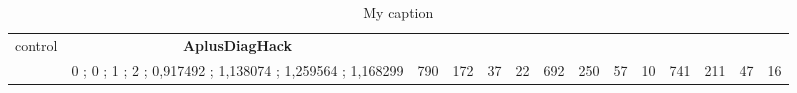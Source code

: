 \begin{table}[]
{\begin{tabular}{|c|c|c|c|c|c|c|c|c|c|c|c|c|c|}
control & \cellcolor{blue!15}\textbf{AplusDiagHack}& {\color[HTML]{00009B} } & {\color[HTML]{9A0000} } & {\color[HTML]{009901} } &  & {\color[HTML]{00009B} } & {\color[HTML]{9A0000} } & {\color[HTML]{009901} } &  & {\color[HTML]{00009B} } & {\color[HTML]{9A0000} } & {\color[HTML]{009901} } &  \\ 
 & \cellcolor{ blue!15}0 ; 0 ; 1 ; 2 ; 0,917492 ; 1,138074 ; 1,259564 ; 1,168299 & \multirow{-2}{*}{{\color[HTML]{00009B} 790}} & \multirow{-2}{*}{{\color[HTML]{9A0000} 172}} & \multirow{-2}{*}{{\color[HTML]{009901} 37}} & \multirow{-2}{*}{22} & \multirow{-2}{*}{{\color[HTML]{00009B} 692}} & \multirow{-2}{*}{{\color[HTML]{9A0000} 250}} & \multirow{-2}{*}{{\color[HTML]{009901} 57}} & \multirow{-2}{*}{10} & \multirow{-2}{*}{{\color[HTML]{00009B} 741}} & \multirow{-2}{*}{{\color[HTML]{9A0000} 211}} & \multirow{-2}{*}{{\color[HTML]{009901} 47}} & \multirow{-2}{*}{16} \\ \hline
\end{tabular}} \caption{ My caption} \label{ my - label} \end{table}
